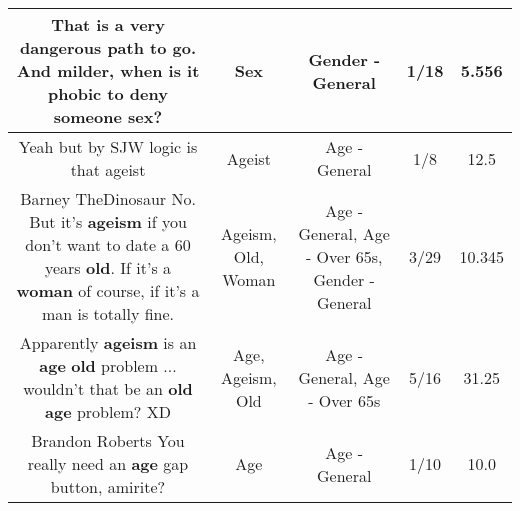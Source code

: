 \documentclass[11pt]{article}
\newlength\mylength
\begin{document}
\begin{center}
\begin{longtable}{|C{.65\mylength}|C{.30\mylength}|C{.12\mylength}|C{.12\mylength}|C{.12\mylength}|}
  \small That is a very dangerous path to go. And milder, when is it phobic to deny someone \textbf{sex}?\normalsize   & Sex & Gender - General & 1/18 & 5.556 \\  \hline
  \small Yeah but by SJW logic is that ageist\normalsize   & Ageist & Age - General & 1/8 & 12.5 \\  \hline
  \small Barney TheDinosaur No. But it's \textbf{ageism} if you don't want to date a 60 years \textbf{old}. If it's a \textbf{woman} of course, if it's a man is totally fine.\normalsize   & Ageism, Old, Woman & Age - General, Age - Over 65s, Gender - General & 3/29 & 10.345 \\  \hline
  \small Apparently \textbf{ageism} is an \textbf{age} \textbf{old} problem ... wouldn't that be an \textbf{old} \textbf{age} problem?   XD\normalsize   & Age, Ageism, Old & Age - General, Age - Over 65s & 5/16 & 31.25 \\  \hline
  \small Brandon Roberts You really need an \textbf{age} gap button, amirite?\normalsize   & Age & Age - General & 1/10 & 10.0 \\  \hline
  
\end{longtable}
\end{center}
\end{document}
